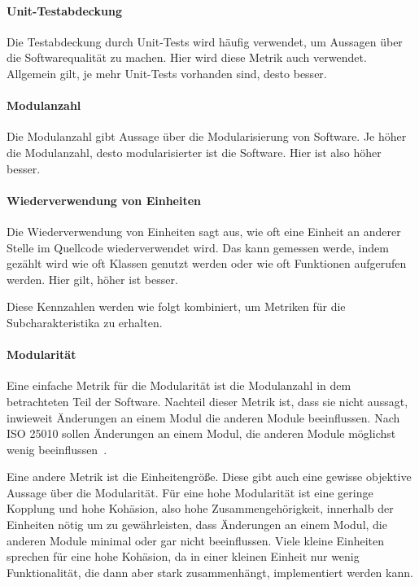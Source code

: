 \documentclass[12pt, a4paper, ngerman]{article}
\begin{document}
\paragraph{Unit-Testabdeckung}

Die Testabdeckung durch Unit-Tests wird häufig verwendet,
um Aussagen über die Softwarequalität zu machen.
Hier wird diese Metrik auch verwendet.
Allgemein gilt, je mehr Unit-Tests vorhanden sind, desto besser.

\paragraph{Modulanzahl}

Die Modulanzahl gibt Aussage über die Modularisierung von Software.
Je höher die Modulanzahl, desto modularisierter ist die Software.
Hier ist also höher besser.

\paragraph{Wiederverwendung von Einheiten}

Die Wiederverwendung von Einheiten sagt aus,
wie oft eine Einheit an anderer Stelle im Quellcode wiederverwendet wird.
Das kann gemessen werde, indem gezählt wird wie oft Klassen genutzt werden
oder wie oft Funktionen aufgerufen werden.
Hier gilt, höher ist besser.

Diese Kennzahlen werden wie folgt kombiniert,
um Metriken für die Subcharakteristika zu erhalten.

\paragraph{Modularität}

Eine einfache Metrik für die Modularität ist die Modulanzahl
in dem betrachteten Teil der Software.
Nachteil dieser Metrik ist, dass sie nicht aussagt,
inwieweit Änderungen an einem Modul die anderen Module beeinflussen.
Nach ISO 25010 sollen Änderungen an einem Modul,
die anderen Module möglichst wenig beeinflussen~\cite{ISO25010}.

Eine andere Metrik ist die Einheitengröße.
Diese gibt auch eine gewisse objektive Aussage über die Modularität.
Für eine hohe Modularität ist eine geringe Kopplung und
hohe Kohäsion, also hohe Zusammengehörigkeit, innerhalb der Einheiten nötig um zu gewährleisten,
dass Änderungen an einem Modul, die anderen Module minimal oder gar nicht beeinflussen.
Viele kleine Einheiten sprechen für eine hohe Kohäsion,
da in einer kleinen Einheit nur wenig Funktionalität,
die dann aber stark zusammenhängt, implementiert werden kann.
\end{document}
